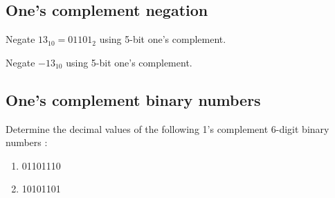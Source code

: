 \subsection{One's complement negation}

Negate $13_{10} = 01101_2$ using 5-bit one's complement.
\vspace{10em}

\noindent Negate $-13_{10}$ using 5-bit one's complement.
\vspace{10em}

\subsection{One's complement binary numbers}


\vspace{20em}

\begin{prob}
  Determine the decimal values of the following 1’s complement 6-digit binary numbers :
  \begin{enumerate}
  \item 01101110
  \item 10101101
  \end{enumerate}
\end{prob}
\vspace{20em}

